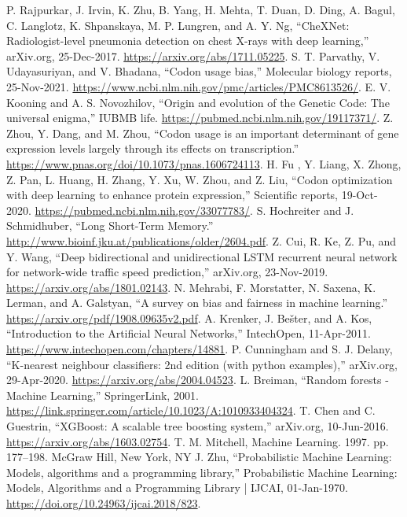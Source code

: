 \documentclass[conference]{IEEEtran}
\begin{document}
\begin{thebibliography}{00}
 P. Rajpurkar, J. Irvin, K. Zhu, B. Yang, H. Mehta, T. Duan, D. Ding, A. Bagul, C. Langlotz, K. Shpanskaya, M. P. Lungren, and A. Y. Ng, “CheXNet: Radiologist-level pneumonia detection on chest X-rays with deep learning,” arXiv.org, 25-Dec-2017. \url{https://arxiv.org/abs/1711.05225}. 
 S. T. Parvathy, V. Udayasuriyan, and V. Bhadana, “Codon usage bias,” Molecular biology reports, 25-Nov-2021. \url{https://www.ncbi.nlm.nih.gov/pmc/articles/PMC8613526/}. 
 E. V. Kooning and A. S. Novozhilov, “Origin and evolution of the Genetic Code: The universal enigma,” IUBMB life. \url{https://pubmed.ncbi.nlm.nih.gov/19117371/}. 
 Z. Zhou, Y. Dang, and M. Zhou, “Codon usage is an important determinant of gene expression levels largely through its effects on transcription.” \url{https://www.pnas.org/doi/10.1073/pnas.1606724113}. 
 H. Fu , Y. Liang, X. Zhong, Z. Pan, L. Huang, H. Zhang, Y. Xu, W. Zhou, and Z. Liu, “Codon optimization with deep learning to enhance protein expression,” Scientific reports, 19-Oct-2020. \url{https://pubmed.ncbi.nlm.nih.gov/33077783/}. 
 S. Hochreiter and J. Schmidhuber, “Long Short-Term Memory.” \url{http://www.bioinf.jku.at/publications/older/2604.pdf}.
 Z. Cui, R. Ke, Z. Pu, and Y. Wang, “Deep bidirectional and unidirectional LSTM recurrent neural network for network-wide traffic speed prediction,” arXiv.org, 23-Nov-2019. \url{https://arxiv.org/abs/1801.02143}.
 N. Mehrabi, F. Morstatter, N. Saxena, K. Lerman, and A. Galstyan, “A survey on bias and fairness in machine learning.” \url{https://arxiv.org/pdf/1908.09635v2.pdf}. 
 A. Krenker, J. Bešter, and A. Kos, “Introduction to the Artificial Neural Networks,” IntechOpen, 11-Apr-2011. \url{https://www.intechopen.com/chapters/14881}. 
 P. Cunningham and S. J. Delany, “K-nearest neighbour classifiers: 2nd edition (with python examples),” arXiv.org, 29-Apr-2020. \url{https://arxiv.org/abs/2004.04523}. 
 L. Breiman, “Random forests - Machine Learning,” SpringerLink, 2001. \url{https://link.springer.com/article/10.1023/A:1010933404324}. 
 T. Chen and C. Guestrin, “XGBoost: A scalable tree boosting system,” arXiv.org, 10-Jun-2016. \url{https://arxiv.org/abs/1603.02754}. 
 T. M. Mitchell, Machine Learning. 1997. pp. 177–198. McGraw Hill, New York, NY
 J. Zhu, “Probabilistic Machine Learning: Models, algorithms and a programming library,” Probabilistic Machine Learning: Models, Algorithms and a Programming Library | IJCAI, 01-Jan-1970. \url{https://doi.org/10.24963/ijcai.2018/823}. 

\end{thebibliography}
\end{document}
